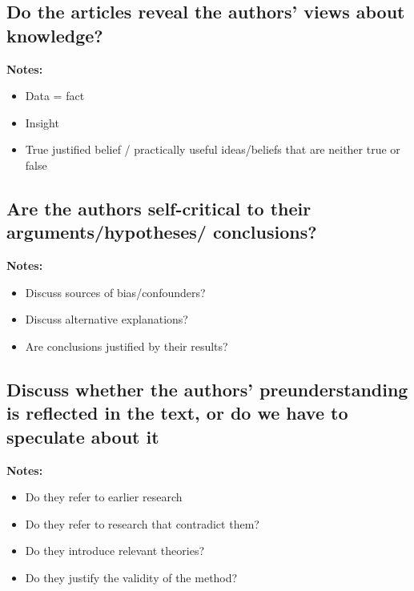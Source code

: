 \documentclass[11pt]{scrartcl}
\begin{document}
\bigbreak

\subsection{Do the articles reveal the authors’ views about knowledge?}

\textbf{Notes:}
\begin{itemize}
  \item Data = fact
  \item Insight
  \item True justified belief / practically useful ideas/beliefs that are neither true or false
\end{itemize}

\bigbreak

\subsection{Are the authors self-critical to their arguments/hypotheses/ conclusions?}

\textbf{Notes:}
\begin{itemize}
  \item Discuss sources of bias/confounders?
  \item Discuss alternative explanations?
  \item Are conclusions justified by their results?
\end{itemize}

\bigbreak

\subsection{Discuss whether the authors’ preunderstanding is reflected in the text, or do we have to speculate about it}

\textbf{Notes:}
\begin{itemize}
  \item Do they refer to earlier research
  \item Do they refer to research that contradict them?
  \item Do they introduce relevant theories?
  \item Do they justify the validity of the method?
\end{itemize}

\bigbreak
\end{document}
